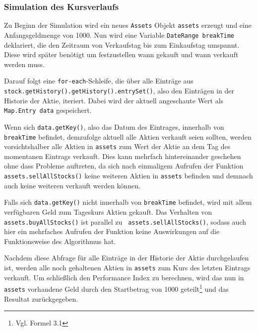 \documentclass[12pt, a4paper, titlepage]{report}
\begin{document}
            		
            \subsubsection{Simulation des Kursverlaufs}
            Zu Beginn der Simulation wird ein neues \texttt{Assets} Objekt \texttt{assets}
            erzeugt und eine Anfangsgeldmenge von 1000. Nun wird eine Variable
            \texttt{DateRange breakTime} deklariert, die den Zeitraum von Verkaufstag
            bis zum Einkaufstag umspannt. Diese wird später benötigt um festzustellen
            wann gekauft und wann verkauft werden muss.
            
            Darauf folgt eine \texttt{for-each}-Schleife, die über alle Einträge aus
            \texttt{stock.get\allowbreak History().getHistory().entrySet()}, also den Einträgen
            in der Historie der Aktie, iteriert. Dabei wird der aktuell angeschaute
            Wert als \texttt{Map.Entry data} gespeichert.
            
            Wenn sich \texttt{data.getKey()}, also das Datum des Eintrages, innerhalb von
            \texttt{breakTime} befindet, demzufolge aktuell alle Aktien verkauft seien sollten,
            werden vorsichtshalber alle Aktien in \texttt{assets} zum Wert der Aktie an
            dem Tag des momentanen Eintrags verkauft. Dies kann mehrfach hintereinander
            geschehen ohne dass Probleme auftreten, da sich nach einmaligem Aufrufen der 
            Funktion \texttt{assets.sellAllStocks()} keine weiteren Aktien in
            \texttt{assets} befinden und demnach auch keine weiteren verkauft werden können.
            
            Falls sich \texttt{data.getKey()} nicht innerhalb von \texttt{breakTime}
            befindet, wird mit allem verfügbaren Geld zum Tageskurs Aktien gekauft.
            Das Verhalten von \texttt{assets.buyAllStocks()} ist parallel zu \texttt{
            assets.sellAllStocks()}, sodass auch hier ein mehrfaches Aufrufen der Funktion
            keine Auswirkungen auf die Funktionsweise des Algorithmus hat.
            
            Nachdem diese Abfrage für alle Einträge in der Historie der Aktie durchgelaufen
            ist, werden alle noch gehaltenen Aktien in \texttt{assets} zum Kurs des
            letzten Eintrags verkauft. Um schließlich den Performance Index zu berechnen,
            wird das nun in \texttt{assets} vorhandene Geld durch den Startbetrag von 1000
            geteilt\footnote{Vgl. Formel 3.1} und das Resultat zurückgegeben.
            
\end{document}
